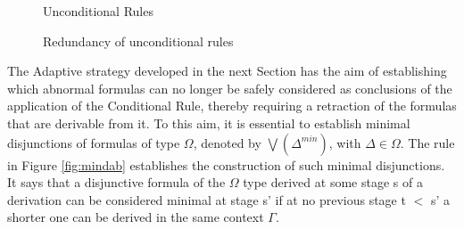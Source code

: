 \documentclass[]{article}
\newcommand{\Turn}[2]
    { {#1}\vdash_{\textbf{\sf s}}  {#2}}
\newcommand{\TurnNext}[2]
    { {#1}\vdash_{\textbf{\sf s+1}}  {#2}}
\newcommand{\TurnNextNext}[2]
    { {#1}\vdash_{\textbf{\sf s+2}}  {#2}}
\newcommand{\TurnNextNextNext}[2]
    { {#1}\vdash_{\textbf{\sf s+3}}  {#2}}
\newcommand{\TurnOne}[2]
    { {#1}\vdash_{\textbf{\sf 1}}  {#2}}
\newcommand{\TurnTwo}[2]
    { {#1}\vdash_{\textbf{\sf 2}}  {#2}}
\newcommand{\TurnThree}[2]
    { {#1}\vdash_{\textbf{\sf 3}}  {#2}}
\newcommand{\TurnFour}[2]
    { {#1}\vdash_{\textbf{\sf 4}}  {#2}}
\newcommand{\TurnFive}[2]
    { {#1}\vdash_{\textbf{\sf 5}}  {#2}}
\newcommand{\TurnSix}[2]
    { {#1}\vdash_{\textbf{\sf 6}}  {#2}}
\newcommand{\TurnSeven}[2]
    { {#1}\vdash_{\textbf{\sf 7}}  {#2}}
\newcommand{\TurnEight}[2]
    { {#1}\vdash_{\textbf{\sf 8}}  {#2}}
\begin{document}
\begin{figure}[h!]

\caption{Unconditional Rules}\label{fig:adaptiverules2}
\end{figure}

\begin{figure}
    \caption{Redundancy of unconditional rules}\label{fig:condasderived}
\end{figure}
 
The Adaptive strategy developed in the next Section has the aim of establishing which abnormal formulas can no longer be safely considered as conclusions of the application of the Conditional Rule, thereby requiring a retraction of the formulas that are derivable from it. To this aim, it is essential to establish minimal disjunctions of formulas of type $\Omega$, denoted by $\bigvee(\Delta^{min})$, with $\Delta\in \Omega$. The rule in Figure \ref{fig:mindab} establishes the construction of such minimal disjunctions. It says that a disjunctive formula of the $\Omega$ type derived at some stage {\sf s} of a derivation can be considered minimal at stage {\sf s'} if at no previous stage {\sf t} $<$ {\sf s'} a shorter one can be derived in the same context $\Gamma$.
\end{document}
